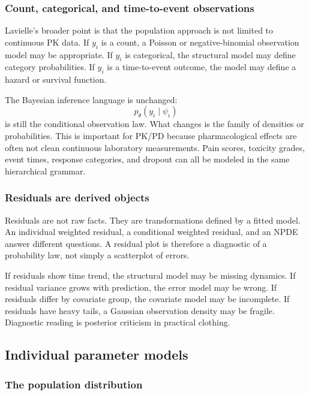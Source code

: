 \subsubsection*{Count, categorical, and time-to-event observations}

Lavielle's broader point is that the population approach is not limited to continuous PK data.  If \(y_i\) is a count, a Poisson or negative-binomial observation model may be appropriate.  If \(y_i\) is categorical, the structural model may define category probabilities.  If \(y_i\) is a time-to-event outcome, the model may define a hazard or survival function.

The Bayesian inference language is unchanged:
\[
  p_\theta(y_i\mid\psi_i)
\]
is still the conditional observation law.  What changes is the family of densities or probabilities.  This is important for PK/PD because pharmacological effects are often not clean continuous laboratory measurements.  Pain scores, toxicity grades, event times, response categories, and dropout can all be modeled in the same hierarchical grammar.

\subsubsection*{Residuals are derived objects}

Residuals are not raw facts.  They are transformations defined by a fitted model.  An individual weighted residual, a conditional weighted residual, and an NPDE answer different questions.  A residual plot is therefore a diagnostic of a probability law, not simply a scatterplot of errors.

If residuals show time trend, the structural model may be missing dynamics.  If residual variance grows with prediction, the error model may be wrong.  If residuals differ by covariate group, the covariate model may be incomplete.  If residuals have heavy tails, a Gaussian observation density may be fragile.  Diagnostic reading is posterior criticism in practical clothing.

\subsection{Individual parameter models}

\subsubsection*{The population distribution}

